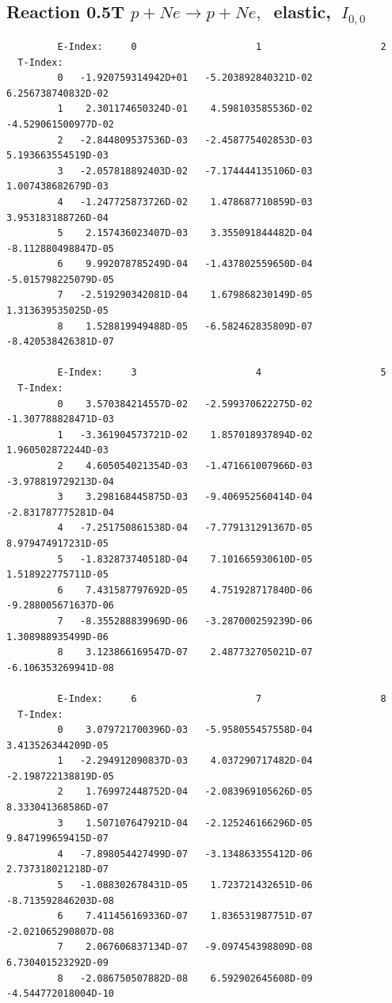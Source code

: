 \documentclass[12pt,dvips]{article}
\begin{document}
\subsection{
Reaction 0.5T  $p + Ne \rightarrow p + Ne ,\ $
 elastic, $\  I_{0,0}$
}

\begin{small}\begin{verbatim}
         E-Index:     0                     1                     2
  T-Index:
         0   -1.920759314942D+01   -5.203892840321D-02    6.256738740832D-02
         1    2.301174650324D-01    4.598103585536D-02   -4.529061500977D-02
         2   -2.844809537536D-03   -2.458775402853D-03    5.193663554519D-03
         3   -2.057818892403D-02   -7.174444135106D-03    1.007438682679D-03
         4   -1.247725873726D-02    1.478687710859D-03    3.953183188726D-04
         5    2.157436023407D-03    3.355091844482D-04   -8.112880498847D-05
         6    9.992078785249D-04   -1.437802559650D-04   -5.015798225079D-05
         7   -2.519290342081D-04    1.679868230149D-05    1.313639535025D-05
         8    1.528819949488D-05   -6.582462835809D-07   -8.420538426381D-07

         E-Index:     3                     4                     5
  T-Index:
         0    3.570384214557D-02   -2.599370622275D-02   -1.307788828471D-03
         1   -3.361904573721D-02    1.857018937894D-02    1.960502872244D-03
         2    4.605054021354D-03   -1.471661007966D-03   -3.978819729213D-04
         3    3.298168445875D-03   -9.406952560414D-04   -2.831787775281D-04
         4   -7.251750861538D-04   -7.779131291367D-05    8.979474917231D-05
         5   -1.832873740518D-04    7.101665930610D-05    1.518922775711D-05
         6    7.431587797692D-05    4.751928717840D-06   -9.288005671637D-06
         7   -8.355288839969D-06   -3.287000259239D-06    1.308988935499D-06
         8    3.123866169547D-07    2.487732705021D-07   -6.106353269941D-08

         E-Index:     6                     7                     8
  T-Index:
         0    3.079721700396D-03   -5.958055457558D-04    3.413526344209D-05
         1   -2.294912090837D-03    4.037290717482D-04   -2.198722138819D-05
         2    1.769972448752D-04   -2.083969105626D-05    8.333041368586D-07
         3    1.507107647921D-04   -2.125246166296D-05    9.847199659415D-07
         4   -7.898054427499D-07   -3.134863355412D-06    2.737318021218D-07
         5   -1.088302678431D-05    1.723721432651D-06   -8.713592846203D-08
         6    7.411456169336D-07    1.836531987751D-07   -2.021065290807D-08
         7    2.067606837134D-07   -9.097454398809D-08    6.730401523292D-09
         8   -2.086750507882D-08    6.592902645608D-09   -4.544772018004D-10
\end{verbatim}\end{small}
\end{document}
